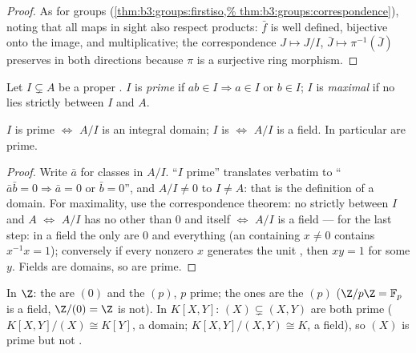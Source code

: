 \begin{proof}
As for groups (\cref{thm:b3:groups:firstiso,%
thm:b3:groups:correspondence}), noting that all maps in sight also
respect products: $\bar f$ is well defined, bijective onto the
image, and multiplicative; the correspondence $J \mapsto J/I$,
$\bar J \mapsto \pi^{-1}(\bar J)$ preserves  in both
directions because $\pi$ is a surjective ring morphism.
\end{proof}

\begin{definition}\label{def:b3:rings:primemaximal}
Let $I \subsetneq A$ be a proper . $I$ is
\emph{prime} if $ab \in I \Rightarrow a \in I$
or $b \in I$; $I$ is \emph{maximal} if no
 lies strictly between $I$ and $A$.
\end{definition}

\begin{proposition}\label{prop:b3:rings:primemaximal}
$I$ is prime $\iff$ $A/I$ is an integral domain; $I$ is 
$\iff$ $A/I$ is a field. In particular  are prime.
\end{proposition}

\begin{proof}
Write $\bar a$ for classes in $A/I$. ``$I$ prime'' translates
verbatim to ``$\bar a\bar b = 0 \Rightarrow \bar a = 0$ or $\bar b
= 0$'', and $A/I \neq 0$ to $I \neq A$: that is the definition of
a domain. For maximality, use the correspondence theorem: no 
strictly between $I$ and $A$ $\iff$ $A/I$ has no  other than
$0$ and itself $\iff$ $A/I$ is a field --- for the last step: in a
field the only  are $0$ and everything (an  containing
$x \ne 0$ contains $x^{-1}x = 1$); conversely if every nonzero $x$
generates the unit , then $xy = 1$ for some $y$. Fields are
domains, so  are prime.
\end{proof}

\begin{example}\label{ex:b3:rings:primemaximal}
In $\Z$: the  are $(0)$ and the $(p)$, $p$ prime; the
 ones are the $(p)$ ($\Z/p\Z = \mathbb F_p$ is a field,
$\Z/(0) = \Z$ is not). In $K[X, Y]$: $(X) \subsetneq (X, Y)$ are
both prime ($K[X,Y]/(X) \cong K[Y]$, a domain;
$K[X,Y]/(X,Y) \cong K$, a field), so $(X)$ is prime but not
.
\end{example}

